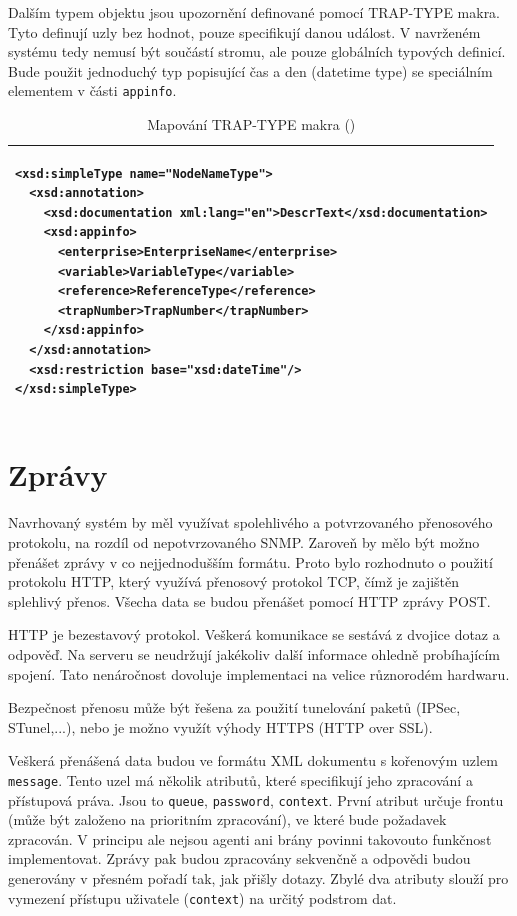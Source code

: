 Dalším typem objektu jsou upozornění definované pomocí TRAP-TYPE makra. Tyto definují uzly bez hodnot, pouze specifikují danou událost. V navrženém systému
tedy nemusí být součástí stromu, ale pouze globálních typových definicí. Bude použit jednoduchý typ popisující čas a den (datetime type) se speciálním elementem
v části \verb|appinfo|.

\begin{table}
	\centering
	{\footnotesize
	  \begin{tabular}{|p{15cm}|}
      \hline
\begin{verbatim}<xsd:simpleType name="NodeNameType">
  <xsd:annotation>
    <xsd:documentation xml:lang="en">DescrText</xsd:documentation>
    <xsd:appinfo>
      <enterprise>EnterpriseName</enterprise>
      <variable>VariableType</variable>
      <reference>ReferenceType</reference>
      <trapNumber>TrapNumber</trapNumber>
    </xsd:appinfo>
  </xsd:annotation>
  <xsd:restriction base="xsd:dateTime"/>
</xsd:simpleType>\end{verbatim}\\
      \hline
    \end{tabular}
  }
	\caption{Mapování TRAP-TYPE makra (\cite{macejko_dipl})}
	\label{tab_xml_trap_type}
\end{table}

\newpage

\section{Zprávy}
Navrhovaný systém by měl využívat spolehlivého a potvrzovaného přenosového protokolu, na rozdíl od nepotvrzovaného SNMP. Zaroveň by mělo být možno
přenášet zprávy v co nejjednodušším formátu. Proto bylo rozhodnuto o použití protokolu HTTP, který využívá přenosový protokol TCP, čímž je zajištěn 
splehlivý přenos. Všecha data se budou přenášet pomocí HTTP zprávy POST.

HTTP je bezestavový protokol. Veškerá komunikace se sestává z dvojice dotaz a odpověď. Na serveru se neudržují jakékoliv další informace ohledně probíhajícím
spojení. Tato nenáročnost dovoluje implementaci na velice různorodém hardwaru.

Bezpečnost přenosu může být řešena za použití tunelování paketů (IPSec, STunel,...), nebo je možno využít výhody HTTPS (HTTP over SSL). 

Veškerá přenášená data budou ve formátu XML dokumentu s kořenovým uzlem \verb|message|. Tento uzel má několik atributů, které specifikují jeho zpracování a přístupová
práva. Jsou to \verb|queue|, \verb|password|, \verb|context|. První atribut určuje frontu (může být založeno na prioritním zpracování), ve které bude požadavek zpracován.
V principu ale nejsou agenti ani brány povinni takovouto funkčnost implementovat. Zprávy pak budou zpracovány sekvenčně a odpovědi budou generovány v přesném pořadí tak, 
jak přišly dotazy. Zbylé dva atributy slouží pro vymezení přístupu uživatele (\verb|context|) na určitý podstrom dat. 

